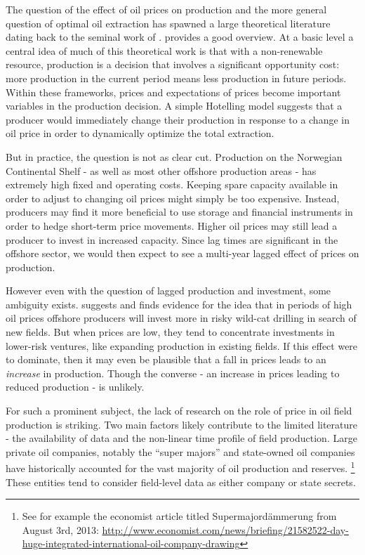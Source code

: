 \documentclass[12pt]{article}
\begin{document}
The question of the effect of oil prices on production and the more general question of optimal oil extraction has spawned a large theoretical literature dating back to the seminal work of \citet{hotelling_economics_1931}. \citet{krautkraemer_nonrenewable_1998} provides a good overview. At a basic level a central idea of much of this theoretical work is that with a non-renewable resource, production is a decision that involves a significant opportunity cost: more production in the current period means less production in future periods.  Within these frameworks, prices and expectations of prices become important variables in the production decision. A simple Hotelling model suggests that a producer would immediately change their production in response to a change in oil price in order to dynamically optimize the total extraction.

But in practice, the question is not as clear cut.  Production on the Norwegian Continental Shelf - as well as most other offshore production areas - has extremely high fixed and operating costs.  Keeping spare capacity available in order to adjust to changing oil prices might simply be too expensive.  Instead, producers may find it more beneficial to use storage and financial instruments in order to hedge short-term price movements. Higher oil prices may still lead a producer to invest in increased capacity.  Since lag times are significant in the offshore sector, we would then expect to see a multi-year lagged effect of prices on production. 

However even with the question of lagged production and investment, some ambiguity exists.  \citet{mohn_efforts_2008} suggests and finds evidence for the idea that in periods of high oil prices offshore producers will invest more in risky wild-cat drilling in search of new fields. But when prices are low, they tend to concentrate investments in lower-risk ventures, like expanding production in existing fields. If this effect were to dominate, then it may even be plausible that a fall in prices leads to an \emph{increase} in production. Though the converse - an increase in prices leading to reduced production - is unlikely.  


For such a prominent subject, the lack of research on the role of price in oil field production is striking. Two main factors likely contribute to the limited literature - the availability of data and the non-linear time profile of field production.  Large private oil companies, notably the “super majors” and state-owned oil companies have historically accounted for the vast majority of oil production and reserves. \footnote{See for example the economist article titled Supermajordämmerung from August 3rd, 2013: \url{http://www.economist.com/news/briefing/21582522-day-huge-integrated-international-oil-company-drawing}} These entities tend to consider field-level data as either company or state secrets.   
\end{document}
